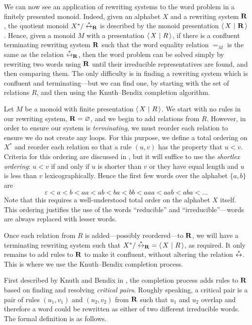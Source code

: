We can now see an application of rewriting systems to the word problem in a
finitely presented monoid.  Indeed, given an alphabet $X$ and a rewriting system
$\mathbf{R}$, the quotient monoid $X^* / \stackrel{*}{\leftrightarrow}_{\mathbf{R}}$ is described by the
monoid presentation $\left\langle\,X ~\middle|~ \mathbf{R}\,\right\rangle$.  Hence, given a monoid $M$ with a
presentation $\left\langle\,X ~\middle|~ R\,\right\rangle$, if there is a confluent terminating rewriting system
$\mathbf{R}$ such that the word equality relation $=_M$ is the same as the
relation $\stackrel{*}{\leftrightarrow}_{\mathbf{R}}$, then the word problem can be solved
simply by rewriting two words using $\mathbf{R}$ until their irreducible
representatives are found, and then comparing them.  The only difficulty is in
finding a rewriting system which is confluent and terminating---but we can find
one, by starting with the set of relations $R$, and then using the Knuth--Bendix
completion algorithm.

Let $M$ be a monoid with finite presentation $\left\langle\,X ~\middle|~ R\,\right\rangle$.
We start with no rules in our rewriting system, $\mathbf{R} = \varnothing$, and
we begin to add relations from $R$.  However, in order to ensure our system is
\textit{terminating}, we must reorder each relation to ensure we do not create
any loops.  For this purpose, we define a total ordering on $X^*$ and reorder
each relation so that a rule $(u, v)$ has the property that $u < v$.  Criteria
for this ordering are discussed in \cite[p.~420]{cgt}, but it will suffice to
use the \textit{shortlex ordering}: $u < v$ if and only if $u$ is shorter than
$v$ or they have equal length and $u$ is less than $v$ lexicographically.  Hence the
first few words over the alphabet $\{a, b\}$ are
$$\varepsilon < a < b < aa < ab < ba < bb < aaa < aab < aba < \ldots$$
Note that this requires a well-understood total order on the alphabet $X$
itself.  This ordering justifies the use of the words ``reducible'' and
``irreducible''---words are always replaced with lesser words.

Once each relation from $R$ is added---possibly reordered---to $\mathbf{R}$, we
will have a terminating rewriting system such that
$X^* / \stackrel{*}{\leftrightarrow}_{\mathbf{R}}\ = \left\langle\,X ~\middle|~ R\,\right\rangle$, as required.  It only remains to add
rules to $\mathbf{R}$ to make it confluent, without altering the relation
$\stackrel{*}{\leftrightarrow}$.  This is where we use the Knuth--Bendix completion process.

First described by Knuth and Bendix in \cite{knuth_bendix}, the completion
process adds rules to $\mathbf{R}$ based on finding and resolving
\textit{critical pairs}.  Roughly speaking, a critical pair is a pair of rules $(u_1, v_1)$ and
$(u_2, v_2)$ from $\mathbf{R}$ such that $u_1$ and $u_2$ overlap and therefore a word could be
rewritten as either of two different irreducible words.  The formal definition
is as follows.

